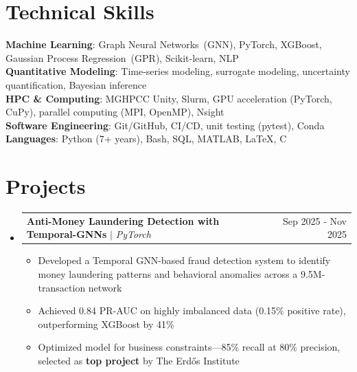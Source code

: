 \documentclass[letterpaper,11pt]{article}
\makeatletter
\newcommand{\resumeItem}[1]{
  \item\small{
    {#1 \vspace{-2pt}}
  }
}
\newcommand{\resumeProjectHeading}[2]{
    \item
    \begin{tabular*}{0.97\textwidth}{l@{\extracolsep{\fill}}r}
      \small#1 & #2 \\
    \end{tabular*}\vspace{-7pt}
}
\newcommand{\resumeSubHeadingListStart}{\begin{itemize}[leftmargin=0.15in, label={}]}
\newcommand{\resumeSubHeadingListEnd}{\end{itemize}}
\newcommand{\resumeItemListStart}{\begin{itemize}}
\newcommand{\resumeItemListEnd}{\end{itemize}\vspace{-5pt}}
\makeatother
\begin{document}
\section{Technical Skills}
 \begin{itemize}[leftmargin=0.15in, label={}]
    \small{\item{
      \textbf{Machine Learning}{: Graph Neural Networks~(GNN), PyTorch, XGBoost, 
      Gaussian Process Regression~(GPR), Scikit-learn, NLP} \\
      \textbf{Quantitative Modeling}{: Time-series modeling, surrogate modeling, uncertainty quantification,
      Bayesian inference} \\
      \textbf{HPC \& Computing}{: MGHPCC Unity, Slurm, GPU acceleration (PyTorch, CuPy), 
      parallel computing (MPI, OpenMP), Nsight} \\
      \textbf{Software Engineering}{: Git/GitHub, CI/CD, unit testing (pytest), Conda}\\
      \textbf{Languages}{: Python (7+ years), Bash, SQL, MATLAB, LaTeX, C}
    }}
 \end{itemize}


\section{Projects}
    \resumeSubHeadingListStart
      \resumeProjectHeading
          {\textbf{Anti-Money Laundering Detection with Temporal-GNNs} $|$ \emph{PyTorch}}{Sep 2025 - Nov 2025}
          \resumeItemListStart
            \resumeItem{Developed a Temporal GNN-based fraud detection system to identify money laundering 
            patterns and behavioral anomalies across a 9.5M-transaction network}
            \resumeItem{Achieved 0.84 PR-AUC on highly imbalanced data (0.15\% positive rate), 
            outperforming XGBoost by 41\%}
            \resumeItem{Optimized model for business constraints—85\% recall at 80\% precision, 
            selected as \textbf{top project} by The Erd\H{o}s Institute}
          \resumeItemListEnd

    \resumeSubHeadingListEnd
    
\end{document}

